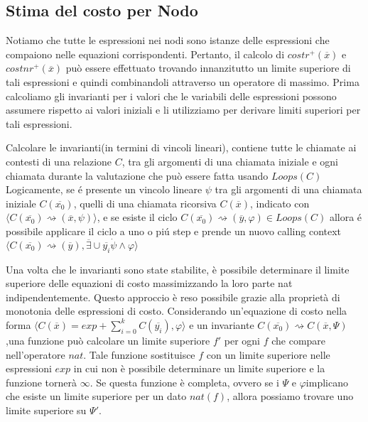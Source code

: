 \documentclass[../../main.tex]{subfiles}
\begin{document}
\subsection{Stima del costo per Nodo}
Notiamo che tutte le espressioni nei nodi sono istanze delle espressioni che compaiono nelle equazioni corrispondenti. Pertanto, il calcolo di $costr^+(\overline{x})$ e $costnr^+(\overline{x})$ può essere effettuato trovando innanzitutto un limite superiore di tali espressioni e quindi combinandoli attraverso un operatore di massimo. Prima calcoliamo gli invarianti per i valori che le variabili delle espressioni possono assumere rispetto ai valori iniziali e li utilizziamo per derivare limiti superiori per tali espressioni.

Calcolare le invarianti(in termini di vincoli lineari), contiene tutte le chiamate ai contesti di una relazione $C$, tra gli argomenti di una chiamata iniziale e ogni chiamata durante la valutazione che può essere fatta usando $Loops(C)$
Logicamente, se é presente un vincolo lineare $\psi$ tra gli argomenti di una chiamata iniziale $C(\overline{x_0})$, quelli di una chiamata ricorsiva $C(\overline{x})$, indicato con $\langle C(\overline{x_0})\rightsquigarrow  (\overline{x}, \psi)\rangle$, e se esiste il ciclo $C(\overline{x_0}) \rightsquigarrow (\overline{y},\varphi)\in Loops(C)$ allora é possibile applicare il ciclo a uno o piú step e prende un nuovo calling context $\langle C(\overline{x_0})  \rightsquigarrow (\overline{y}), \overline{\exists} \cup \overline{y_i}\dot \psi \land \varphi\rangle$

Una volta che le invarianti sono state stabilite, è possibile determinare il limite superiore delle equazioni di costo massimizzando la loro parte nat indipendentemente. Questo approccio è reso possibile grazie alla proprietà di monotonia delle espressioni di costo. Considerando un'equazione di costo nella forma $\langle  C(\overline{x}) = exp + \sum_{i=0}^k C(\overline{y_i}), \varphi \rangle$ e un invariante $C(\overline{x_0})\rightsquigarrow C(\overline{x}, \varPsi) $ ,una funzione può calcolare un limite superiore $f'$ per ogni $f$ che compare nell'operatore $nat$. Tale funzione sostituisce $f$ con un limite superiore nelle espressioni $exp$ in cui non è possibile determinare un limite superiore e la funzione tornerà $\infty$. Se questa funzione è completa, ovvero se i $\varPsi$ e $\varphi$implicano che esiste un limite superiore per un dato $nat(f)$, allora possiamo trovare uno limite superiore su $\varPsi '$.
\cite{albert2008automatic}\cite{amslaurea3135}
\end{document}
